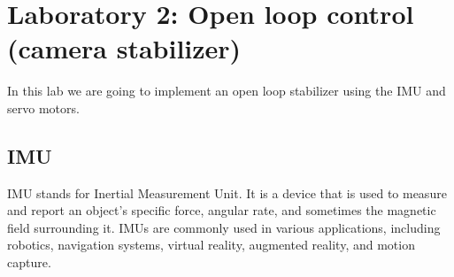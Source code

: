 \documentclass[english]{article}
\begin{document}
\section{Laboratory 2: Open loop control (camera stabilizer)}
In this lab we are going to implement an open loop stabilizer
using the IMU and servo motors.
\subsection{IMU}
IMU stands for Inertial Measurement Unit. It is a device that is used 
to measure and report an object's specific force, angular rate, and 
sometimes the magnetic field surrounding it. IMUs are commonly used in
 various applications, including robotics, navigation systems, virtual 
 reality, augmented reality, and motion capture.\newline
\end{document}

